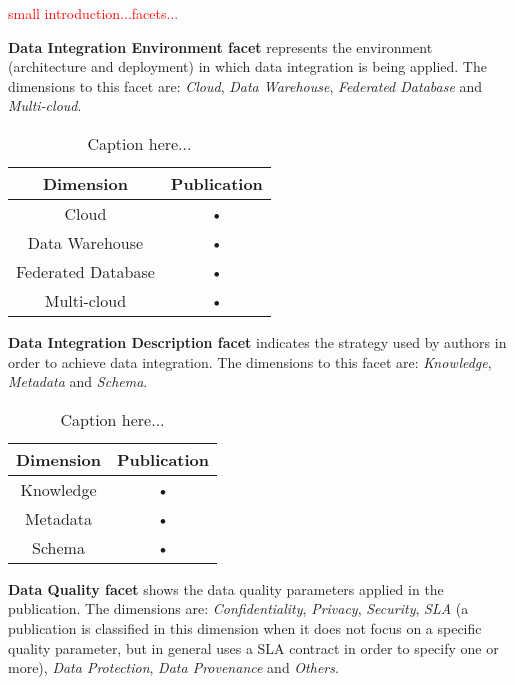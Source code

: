 \documentclass[preprint,12pt]{elsarticle}
\theoremstyle{plain}
\theoremstyle{plain}
\theoremstyle{plain}
\theoremstyle{plain}
\begin{document}
\textcolor{red}{small introduction...facets...}

\begin{description}
\item \textbf{Data Integration Environment facet} represents the environment (architecture and deployment) in which data integration is being applied. The dimensions to this facet are: \textit{Cloud}, \textit{Data Warehouse}, \textit{Federated Database} and \textit{Multi-cloud}.
\begin{table}[h]
\caption{Caption here...}
\begin{center}
\begin{tabular}{|c|c|}
\hline 
\textbf{Dimension} & \textbf{Publication} \\ 
\hline 
Cloud & • \\ 
\hline 
Data Warehouse & • \\ 
\hline 
Federated Database & • \\ 
\hline 
Multi-cloud & • \\ 
\hline 
\end{tabular}
\end{center}
\end{table}
\item \textbf{Data Integration Description facet} indicates the strategy used by authors in order to achieve data integration. The dimensions to this facet are: \textit{Knowledge}, \textit{Metadata} and \textit{Schema}.
\begin{table}[h]
\caption{Caption here...}
\begin{center}
\begin{tabular}{|c|c|}
\hline 
\textbf{Dimension} & \textbf{Publication} \\ 
\hline 
Knowledge & • \\ 
\hline 
Metadata & • \\ 
\hline 
Schema & • \\ 
\hline 
\end{tabular}
\end{center}
\end{table}
\item \textbf{Data Quality facet} shows the data quality parameters applied in the publication. The dimensions are: \textit{Confidentiality}, \textit{Privacy}, \textit{Security}, \textit{SLA} (a publication is classified in this dimension when it does not focus on a specific quality parameter, but in general uses a SLA contract in order to specify one or more), \textit{Data Protection}, \textit{Data Provenance} and \textit{Others}.
\begin{table}[h]

\end{table}
\end{description}
\end{document}
